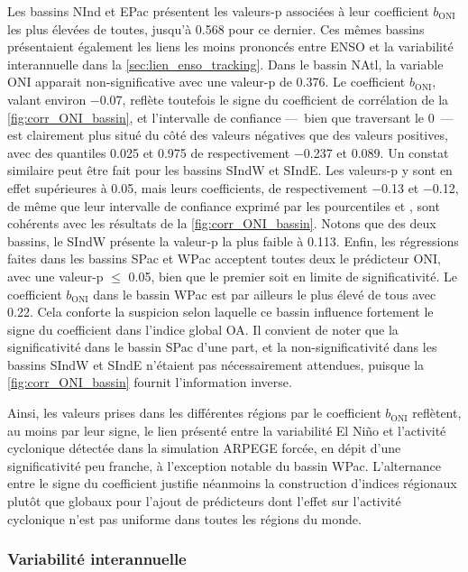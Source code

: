 \documentclass[../main.tex]{subfiles}
\begin{document}
Les bassins NInd et EPac présentent les valeurs-p associées à leur coefficient $b_{\mathrm{ONI}}$ les plus élevées de toutes, jusqu'à \num{0.568} pour ce
dernier. Ces mêmes bassins présentaient également les liens les moins prononcés entre ENSO et la variabilité interannuelle dans la
\cref{sec:lien_enso_tracking}. Dans le bassin NAtl, la variable ONI apparait non-significative avec une valeur-p de \num{0.376}. Le coefficient
$b_{\mathrm{ONI}}$, valant environ \num{-0.07}, reflète toutefois le signe du coefficient de corrélation de la \cref{fig:corr_ONI_bassin}, et l'intervalle de
confiance ---~bien que traversant le \num{0}~--- est clairement plus situé du côté des valeurs négatives que des valeurs positives, avec des quantiles
\num{0.025} et \num{0.975} de respectivement \num{-0.237} et \num{0.089}. Un constat similaire peut être fait pour les bassins SIndW et SIndE. Les valeurs-p y
sont en effet supérieures à \num{0.05}, mais leurs coefficients, de respectivement \num{-0.13} et \num{-0.12}, de même que leur intervalle de confiance exprimé
par les pourcentiles  et , sont cohérents avec les résultats de la \cref{fig:corr_ONI_bassin}. Notons que des deux bassins, le SIndW
présente la valeur-p la plus faible à \num{0.113}. Enfin, les régressions faites dans les bassins SPac et WPac acceptent toutes deux le prédicteur ONI, avec une
valeur-p $\leq$ \num{0.05}, bien que le premier soit en limite de significativité. Le coefficient $b_{\mathrm{ONI}}$ dans le bassin WPac est par ailleurs le
plus élevé de tous avec \num{0.22}. Cela conforte la suspicion selon laquelle ce bassin influence fortement le signe du coefficient dans l'indice global OA. Il
convient de noter que la significativité dans le bassin SPac d'une part, et la non-significativité dans les bassins SIndW et SIndE n'étaient pas nécessairement
attendues, puisque la \cref{fig:corr_ONI_bassin} fournit l'information inverse. 

Ainsi, les valeurs prises dans les différentes régions par le coefficient $b_{\mathrm{ONI}}$ reflètent, au moins par leur signe, le lien présenté entre la
variabilité El Niño et l'activité cyclonique détectée dans la simulation ARPEGE forcée, en dépit d'une significativité peu franche, à l'exception notable du
bassin WPac. L'alternance entre le signe du coefficient justifie néanmoins la construction d'indices régionaux plutôt que globaux pour l'ajout de prédicteurs
dont l'effet sur l'activité cyclonique n'est pas uniforme dans toutes les régions du monde.

\subsubsection{Variabilité interannuelle}
\end{document}
